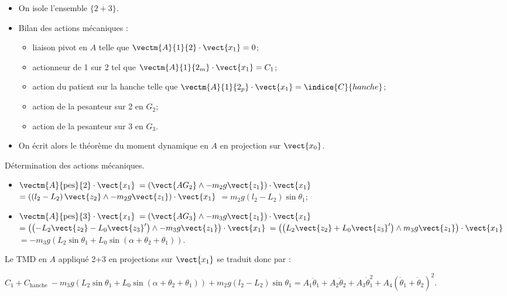 \ifprof
\begin{corrige}
\begin{itemize}
\item On isole l'ensemble $\{2+3\}$.  
\item Bilan des actions mécaniques : 
\begin{itemize}
\item liaison pivot en $A$ telle que $\vectm{A}{1}{2}\cdot \vect{x_1} = 0$;
\item actionneur de 1 sur 2 tel que  $\vectm{A}{1}{2_m}\cdot \vect{x_1} = C_1$;
\item action du patient sur la hanche telle que  $\vectm{A}{1}{2_p}\cdot \vect{x_1} = \indice{C}{hanche}$;
\item action de la pesanteur sur 2 en $G_2$;
\item action de la pesanteur sur 3 en $G_3$.
\end{itemize}
\item On écrit alors le théorème du moment dynamique en $A$ en projection sur $\vect{x_0}$.
\end{itemize}
\end{corrige}
\else
\fi


\ifprof
\begin{corrige}
Détermination des actions mécaniques.
\begin{itemize}
\item $\vectm{A}{\text{pes}}{2}\cdot \vect{x_1}$ 
$ =\left(\vect{AG_2}\wedge - m_2 g \vect{z_1} \right)\cdot \vect{x_1}$
$ =\left(\left( l_2 - L_2\right)\vect{z_2}\wedge - m_2 g \vect{z_1} \right)\cdot \vect{x_1}$
$ = m_2 g\left( l_2 - L_2\right) \sin \theta_1$;
\item $\vectm{A}{\text{pes}}{3}\cdot \vect{x_1}$ 
$ =\left(\vect{AG_3}\wedge - m_3 g \vect{z_1} \right)\cdot \vect{x_1}$
$ =\left(\left(  - L_2 \vect{z_2}- L_0 \vect{z_3}'\right)\wedge - m_3 g \vect{z_1} \right)\cdot \vect{x_1}$
$ =\left(\left( L_2 \vect{z_2} + L_0 \vect{z_3}'\right)\wedge m_3 g \vect{z_1} \right)\cdot \vect{x_1}$
$ = - m_3 g\left(  L_2 \sin \theta_1 +  L_0 \sin\left( \alpha + \theta_2 + \theta_1\right)\right) $.
\end{itemize}

Le TMD en $A$ appliqué 2+3 en projections sur $\vect{x_1}$ se traduit donc par :

  $C_{1} + C_{\textrm {hanche }}- m_3 g\left(  L_2 \sin \theta_1 +  L_0 \sin\left( \alpha + \theta_2 + \theta_1\right)\right)  + m_2 g\left( l_2 - L_2\right) \sin \theta_1 = A_{1} \ddot{\theta}_{1}+A_{2} \ddot{\theta}_{2}+A_{3} \dot{\theta}_{1}^{2}+A_{4}\left(\dot{\theta}_{1}+\dot{\theta}_{2}\right)^{2}$.
\end{corrige}
\else
\fi

